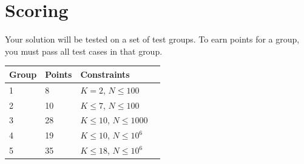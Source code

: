 \section*{Scoring}
Your solution will be tested on a set of test groups. To earn points for a group, you must pass all test cases in that group.

\noindent
\begin{tabular}{| l | l | l | l |}
\hline
Group & Points & Constraints \\ \hline
	1     & 8 & $K = 2$, $N \le 100$ \\ \hline
	2     & 10 & $K \le 7$, $N \le 100$ \\ \hline
	3     & 28 & $K \le 10$, $N \le 1000$ \\ \hline
	4     & 19 & $K \le 10$, $N \le 10^6$ \\ \hline
	5     & 35 & $K \le 18$, $N \le 10^6$ \\ \hline
\end{tabular}
